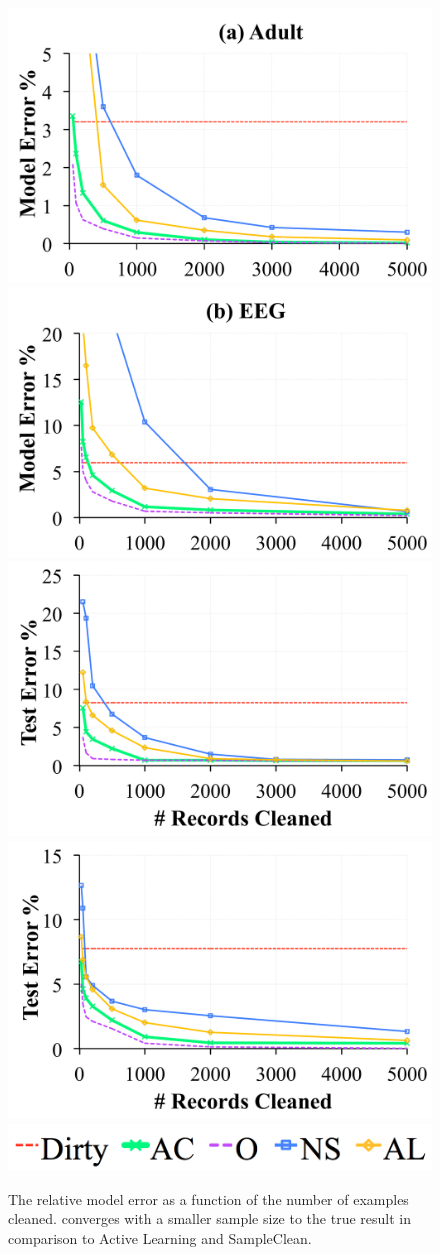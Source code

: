 \iffalse
\begin{figure}[t]
\centering\vspace{-1em}
 \includegraphics[width=0.49\columnwidth]{exp/exp3b.pdf}
  \includegraphics[width=0.49\columnwidth]{exp/exp3c.pdf}
  \includegraphics[width=0.49\columnwidth]{exp/exp3bb.pdf}
  \includegraphics[width=0.49\columnwidth]{exp/exp3cc.pdf}
  \includegraphics[width=0.5\columnwidth]{exp/legend-general.png}\vspace{-0.5em}
 \caption{ The relative model error as a function of the number of examples cleaned. \sys converges with a smaller sample size to the true result in comparison to Active Learning and SampleClean. \label{prio-perf}}\vspace{-1em}
\end{figure}

